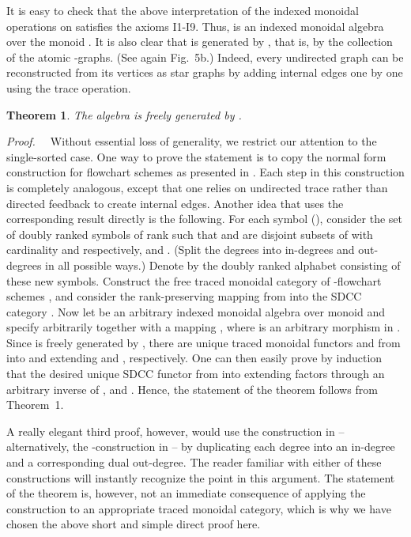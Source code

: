 \documentclass{eptcs}
\newtheorem{theorem}{Theorem}
\begin{document}
It is easy to check that the above interpretation of the indexed monoidal operations on
 satisfies the axioms I1-I9. Thus,  is an indexed
monoidal algebra over the monoid . It is also clear that  is
generated by , that is, by the collection of the atomic -graphs.
(See again Fig.~5b.) Indeed, every undirected graph can be reconstructed from
its vertices as star graphs by adding internal edges one by one using the
trace operation. 
\begin{theorem}
The algebra  is freely generated by . 
\end{theorem}
{\em Proof.\ \ }
Without essential loss of generality, we restrict our attention to the
single-sorted case. One way to prove the statement is to copy the normal form construction
for flowchart schemes as presented in \cite{acta}. Each step in this construction
\cite [Theorem 3.3]{mun} is completely analogous, except that one relies on undirected trace 
rather than directed feedback to create internal edges. 
Another idea that uses the corresponding result \cite[Corollary 2]{acta} 
directly
is the following. For each symbol  (), consider the set of 
doubly ranked symbols  of rank  such that  and  are disjoint 
subsets of  with cardinality  and  respectively, and
. (Split the degrees into in-degrees and out-degrees in all possible ways.) Denote by
 the doubly ranked alphabet consisting of these new symbols. Construct
the free traced monoidal category   of -flowchart schemes
\cite{acta}, and consider the rank-preserving mapping  from
 into the SDCC category . Now let  be an
arbitrary indexed monoidal algebra over monoid  and specify  arbitrarily 
together with a mapping , where 
 is an arbitrary morphism in .
Since  is freely generated by , there are unique
traced monoidal functors  and   from  into 
 and  extending  and ,
respectively. One can then easily prove by induction that the desired unique SDCC functor
from  into  extending  factors through an
arbitrary inverse of , and . Hence, the statement of the theorem
follows from Theorem~1.

A really elegant third proof, however, would use the  construction in \cite{tra}
-- alternatively, the -construction in \cite{concur} -- by duplicating each
degree into an in-degree and a corresponding dual out-degree. The reader
familiar with either of these constructions will instantly recognize the point in this
argument. The statement of the theorem is, however, not an immediate consequence
of applying the construction to an appropriate traced monoidal category,
which is why we have chosen the above short and simple direct proof here.
\vege
\end{document}
